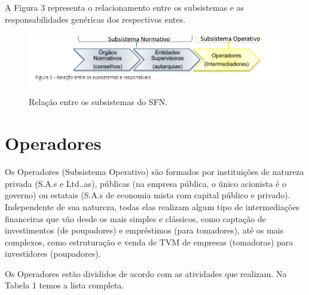 \documentclass{article}\usepackage[]{graphicx}\usepackage[]{xcolor}
\begin{document}
A Figura 3 representa o relacionamento entre os subsistemas e as responsabilidades genéricas dos respectivos entes.

\begin{figure}[H]
\includegraphics[width=12cm]{sfn-subsistemas}
\centering
\label{sfn-subsistemas}
\caption{Relação entre os subsistemas do SFN.}
\end{figure}

\section*{Operadores}

Os Operadores (Subsistema Operativo) são formados por instituições de natureza privada (S.A.s e Ltd..as), 
públicas (na empresa pública, o único acionista é o governo) ou estatais (S.A.s de economia mista com 
capital público e privado). Independente de sua natureza, todas elas realizam algum tipo de intermediações 
financeiras que vão desde os mais simples e clássicos, como captação de investimentos (de poupadores) e 
empréstimos (para tomadores), até os mais complexos, como estruturação e venda de TVM de empresas 
(tomadoras) para investidores (poupadores).\par

Os Operadores estão divididos de acordo com as atividades que realizam. Na Tabela 1 temos a lista completa.
\end{document}
